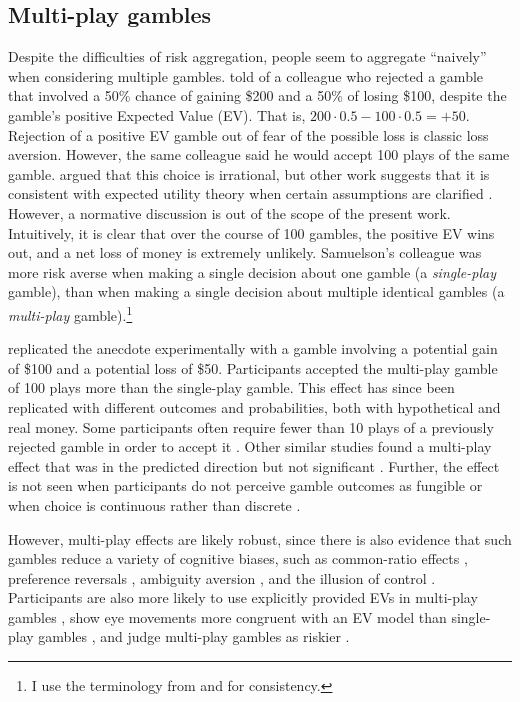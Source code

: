 \documentclass[a4paper, nobind, dvipsnames]{templates/ociamthesis}
\theoremstyle{definition}
\theoremstyle{definition}
\theoremstyle{definition}
\theoremstyle{definition}
\theoremstyle{remark}
\begin{document}
\subsection{Multi-play gambles}

Despite the difficulties of risk aggregation, people seem to aggregate ``naively''
when considering multiple gambles. \textcite{samuelson1963} told of a colleague who
rejected a gamble that involved a 50\% chance of gaining \$200 and a 50\% of losing
\$100, despite the gamble's positive Expected Value (EV). That is, \(200 \cdot 0.5 - 100 \cdot 0.5 = +50\). Rejection of a positive EV gamble out of fear of the
possible loss is classic loss aversion. However, the same colleague said he
would accept 100 plays of the same gamble. \textcite{samuelson1963} argued that this
choice is irrational, but other work suggests that it is consistent with
expected utility theory when certain assumptions are clarified \autocites[e.g.,][]{ross1999,aloysius2007}. However, a normative discussion is out of the scope of the
present work. Intuitively, it is clear that over the course of 100 gambles, the
positive EV wins out, and a net loss of money is extremely unlikely. Samuelson's
colleague was more risk averse when making a single decision about one gamble (a
\emph{single-play} gamble), than when making a single decision about multiple
identical gambles (a \emph{multi-play} gamble).\footnote{I use the terminology from \textcite{bristow2011} and \textcite{camilleri2013} for
  consistency.}

\textcite{wedell1994} replicated the \textcite{samuelson1963} anecdote experimentally with a gamble
involving a potential gain of \$100 and a potential loss of \$50. Participants
accepted the multi-play gamble of 100 plays more than the single-play gamble.
This effect has since been replicated with different outcomes and probabilities,
both with hypothetical and real money. Some participants often require fewer
than 10 plays of a previously rejected gamble in order to accept it \autocite{dekay2005,keren1991,montgomery1982,redelmeier1992}. Other similar studies found a
multi-play effect that was in the predicted direction but not significant
\autocite{barron2003,benartzi1999,klos2005,langer2001}. Further, the effect is not
seen when participants do not perceive gamble outcomes as fungible \autocite{dekay2006,dekay2005,dekay2011} or when choice is continuous rather than discrete
\autocite{bristow2011}.

However, multi-play effects are likely robust, since there is also evidence that
such gambles reduce a variety of cognitive biases, such as common-ratio effects
\autocite{keren1987,keren1991,dekay2006}, preference reversals \autocite{wedell1990},
ambiguity aversion \autocite{liu2009}, and the illusion of control \autocite{koehler1994}.
Participants are also more likely to use explicitly provided EVs in multi-play
gambles \autocite{li2003}, show eye movements more congruent with an EV model than
single-play gambles \autocite{su2013}, and judge multi-play gambles as riskier
\autocite{joag1990}.
\end{document}
